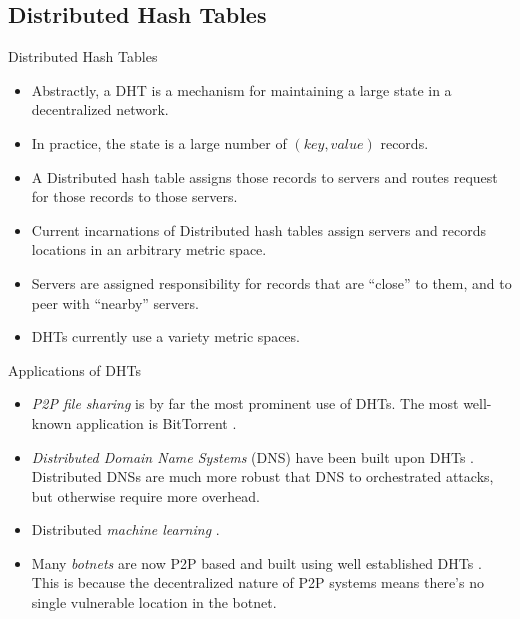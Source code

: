 \documentclass[8pt]{beamer}
\begin{document}
\subsection{Distributed Hash Tables}
	\begin{frame}{Distributed Hash Tables}
		\begin{itemize}
			\item Abstractly, a DHT is a mechanism for maintaining a large state in a decentralized network.
			\item In practice, the state is a large number of $ (key, value) $ records.
			\item A Distributed hash table assigns those records to servers and routes request for those records to those servers.
			\item Current incarnations of Distributed hash tables assign servers and records locations in an arbitrary metric space.
			\item Servers are assigned responsibility for records that are ``close'' to them, and to peer with ``nearby'' servers.
			\item DHTs currently use a variety metric spaces.
		\end{itemize}


	\end{frame}

	\begin{frame}{Applications of DHTs}
		\begin{itemize}
			\item \textit{P2P file sharing} is by far the most prominent use of DHTs.  
			The most well-known application is BitTorrent \cite{bittorrent}.
			\item \textit{Distributed Domain Name Systems} (DNS) have been built upon DHTs \cite{cox2002serving} \cite{pappas2006comparative}.
			Distributed DNSs are much more robust that DNS to orchestrated attacks, but otherwise require more overhead.
			\item Distributed \textit{machine learning} \cite{liparameter}.
			\item Many \textit{botnets} are now P2P based and built using well established DHTs \cite{saad2011detecting}. 
			This is because the decentralized nature of P2P systems means there's no single vulnerable location in the botnet.
		\end{itemize}
	\end{frame}
\end{document}

